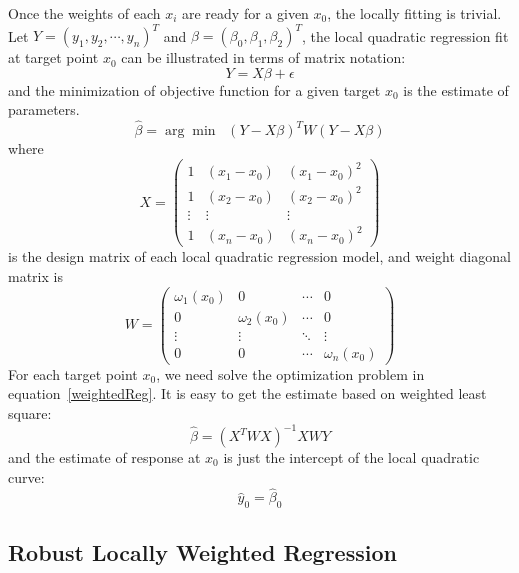 Once the weights of each $x_i$ are ready for a given $x_0$, the locally fitting
is trivial. Let $Y=(y_1, y_2, \cdots, y_n)^{T}$ and 
$\beta = (\beta_0, \beta_1, \beta_2)^{T}$, the local quadratic regression fit at
target point $x_0$ can be illustrated in terms of matrix notation:
\begin{equation}
Y = X \beta + \epsilon
\end{equation} 
and the minimization of objective function for a given target $x_0$ is the estimate
of parameters. 
\begin{equation}
\label{weightedReg}
\hat \beta = \arg\min \;\; (Y - X\beta)^TW(Y - X\beta)
\end{equation} 
where
\begin{equation}
X =  
\begin{pmatrix}
  1 & (x_1-x_0) & (x_1-x_0)^2 \\
  1 & (x_2-x_0) & (x_2-x_0)^2 \\
  \vdots  & \vdots & \vdots  \\
  1 & (x_n-x_0) & (x_n-x_0)^2 
\end{pmatrix}
\end{equation} 
is the design matrix of each local quadratic regression model, and weight diagonal
matrix is
\begin{equation}
W =  
\begin{pmatrix}
  \omega_1(x_0) & 0 & \cdots & 0 \\
  0 & \omega_2(x_0) & \cdots & 0 \\
  \vdots  & \vdots & \ddots & \vdots  \\
  0 & 0 & \cdots & \omega_n(x_0) 
\end{pmatrix}
\end{equation} 
For each target point $x_0$, we need solve the optimization problem in 
equation~\ref{weightedReg}. It is easy to get the estimate based on weighted
least square:
\begin{equation}
\hat \beta = (X^TWX)^{-1}XWY
\end{equation}
and the estimate of response at $x_0$ is just the intercept of the local quadratic
curve:
\begin{equation}
\hat y_0 = \hat \beta_0
\end{equation}

\subsection{Robust Locally Weighted Regression}

